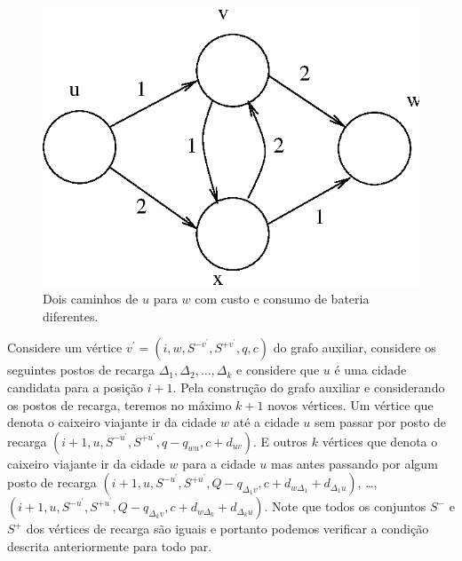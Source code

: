 \documentclass{article}
\begin{document}
\begin{figure}[ht]
  \centering
  \includegraphics[scale=.7]{fig3.eps}
  \caption{Dois caminhos de $u$ para $w$ com custo e consumo de bateria diferentes.}
  \label{fig3}
\end{figure}


Considere um vértice $v^\prime=(i, w, S^{-v^\prime}, S^{+v^\prime}, q, c)$ do grafo auxiliar, considere os seguintes postos de recarga $\Delta_1, \Delta_2, \dots, \Delta_k$ e considere que $u$ é uma cidade candidata para a posição $i+1$. Pela construção do grafo auxiliar e considerando os postos de recarga, teremos no máximo $k + 1$ novos vértices. Um vértice que denota o caixeiro viajante ir da cidade $w$ até a cidade $u$ sem passar por posto de recarga $(i+1, u, S^{-u^\prime}, S^{+u^\prime}, q-q_{wu}, c+d_{uv})$. E outros $k$ vértices que denota o caixeiro viajante ir da cidade $w$ para a cidade $u$ mas antes passando por algum posto de recarga $(i+1, u, S^{-u^\prime}, S^{+u^\prime}, Q-q_{\Delta_1v}, c+d_{w\Delta_1} + d_{\Delta_1u})$, \dots, $(i+1, u, S^{-u^\prime}, S^{+u^\prime}, Q-q_{\Delta_kv}, c+d_{w\Delta_k} + d_{\Delta_ku})$. Note que todos os conjuntos $S^-$ e $S^+$ dos vértices de recarga são iguais e portanto podemos verificar a condição descrita anteriormente para todo par.

\medskip
\printbibliography
\end{document}
